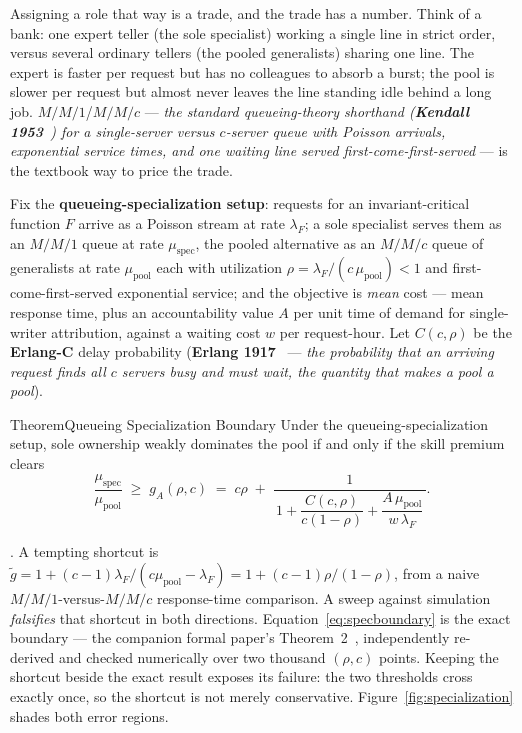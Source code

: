\documentclass[11pt,a4paper]{article}
\theoremstyle{definition}
\theoremstyle{plain}
\begin{document}
Assigning a role that way is a trade, and the trade has a number. Think of a bank:
one expert teller (the sole specialist) working a single line in strict order,
versus several ordinary tellers (the pooled generalists) sharing one line. The
expert is faster per request but has no colleagues to absorb a burst; the pool is
slower per request but almost never leaves the line standing idle behind a long
job. \textbf{$M/M/1$}/\textbf{$M/M/c$} --- \emph{the standard queueing-theory
shorthand (\textbf{Kendall 1953}~) for a single-server versus
$c$-server queue with Poisson arrivals, exponential service times, and one waiting
line served first-come-first-served} --- is the textbook way to price the trade.

Fix the \textbf{queueing-specialization setup}: requests for an invariant-critical
function $F$ arrive as a Poisson stream at rate $\lambda_F$; a sole specialist
serves them as an $M/M/1$ queue at rate $\mu_{\mathrm{spec}}$, the pooled
alternative as an $M/M/c$ queue of generalists at rate $\mu_{\mathrm{pool}}$ each
with utilization $\rho=\lambda_F/(c\,\mu_{\mathrm{pool}})<1$ and
first-come-first-served exponential service; and the objective is \emph{mean} cost
--- mean response time, plus an accountability value $A$ per unit time of demand
for single-writer attribution, against a waiting cost $w$ per request-hour. Let
$C(c,\rho)$ be the \textbf{Erlang-C} delay probability (\textbf{Erlang
1917}~ --- \emph{the probability that an arriving request finds
all $c$ servers busy and must wait, the quantity that makes a pool a pool}).

\begin{pdclaim}{Theorem}{Queueing Specialization Boundary}
\setlength{\parskip}{4pt plus 1pt}
\label{thm:specialization}
Under the queueing-specialization setup, sole ownership weakly dominates the pool
if and only if the skill premium clears
\begin{equation}\label{eq:specboundary}
\frac{\mu_{\mathrm{spec}}}{\mu_{\mathrm{pool}}} \;\ge\; g_A(\rho,c)
\;=\; c\rho \;+\; \frac{1}{\,1 + \dfrac{C(c,\rho)}{c(1-\rho)}
      + \dfrac{A\,\mu_{\mathrm{pool}}}{w\,\lambda_F}\,}.
\end{equation}
\end{pdclaim}

\noindent\Verified. A tempting shortcut is
$\tilde g = 1+(c-1)\lambda_F/(c\mu_{\mathrm{pool}}-\lambda_F)
= 1+(c-1)\rho/(1-\rho)$, from a naive
$M/M/1$-versus-$M/M/c$ response-time comparison. A sweep against simulation
\emph{falsifies} that shortcut in both directions. Equation~\ref{eq:specboundary}
is the exact boundary --- the companion formal paper's
Theorem~2~, independently re-derived and checked numerically over two
thousand $(\rho,c)$ points. Keeping the shortcut beside the exact result exposes
its failure: the two thresholds cross exactly once, so the shortcut is not merely
conservative. Figure~\ref{fig:specialization} shades both error regions.
\end{document}
